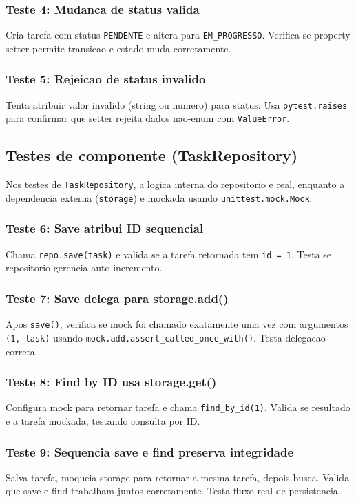\documentclass[11pt,a4paper]{article}
\begin{document}
\subsubsection{Teste 4: Mudanca de status valida}
Cria tarefa com status \texttt{PENDENTE} e altera para \texttt{EM\_PROGRESSO}. Verifica se property setter permite transicao e estado muda corretamente.

\subsubsection{Teste 5: Rejeicao de status invalido}
Tenta atribuir valor invalido (string ou numero) para status. Usa \texttt{pytest.raises} para confirmar que setter rejeita dados nao-enum com \texttt{ValueError}.

\subsection{Testes de componente (TaskRepository)}
Nos testes de \texttt{TaskRepository}, a logica interna do repositorio e real, enquanto a dependencia externa (\texttt{storage}) e mockada usando \texttt{unittest.mock.Mock}.

\subsubsection{Teste 6: Save atribui ID sequencial}
Chama \texttt{repo.save(task)} e valida se a tarefa retornada tem \texttt{id = 1}. Testa se repositorio gerencia auto-incremento.

\subsubsection{Teste 7: Save delega para storage.add()}
Apos \texttt{save()}, verifica se mock foi chamado exatamente uma vez com argumentos \texttt{(1, task)} usando \texttt{mock.add.assert\_called\_once\_with()}. Testa delegacao correta.

\subsubsection{Teste 8: Find by ID usa storage.get()}
Configura mock para retornar tarefa e chama \texttt{find\_by\_id(1)}. Valida se resultado e a tarefa mockada, testando consulta por ID.

\subsubsection{Teste 9: Sequencia save e find preserva integridade}
Salva tarefa, moqueia storage para retornar a mesma tarefa, depois busca. Valida que save e find trabalham juntos corretamente. Testa fluxo real de persistencia.
\end{document}
